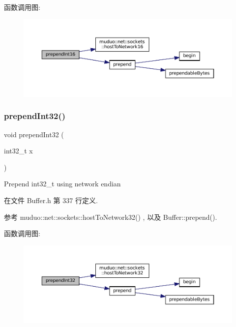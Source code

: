 函数调用图\+:
\nopagebreak
\begin{figure}[H]
\begin{center}
\leavevmode
\includegraphics[width=350pt]{classmuduo_1_1net_1_1Buffer_a1c47f5d97958f529ef78f0ba283e33d0_cgraph}
\end{center}
\end{figure}
\mbox{\label{classmuduo_1_1net_1_1Buffer_a280f25c26e5867377de5c0c31dbc06c1}} 
\subsubsection{\texorpdfstring{prepend\+Int32()}{prependInt32()}}
{\footnotesize\ttfamily void prepend\+Int32 (\begin{DoxyParamCaption}\item[{int32\+\_\+t}]{x }\end{DoxyParamCaption})\hspace{0.3cm}{\ttfamily [inline]}}

Prepend int32\+\_\+t using network endian 

在文件 Buffer.\+h 第 337 行定义.



参考 muduo\+::net\+::sockets\+::host\+To\+Network32() , 以及 Buffer\+::prepend().

函数调用图\+:
\nopagebreak
\begin{figure}[H]
\begin{center}
\leavevmode
\includegraphics[width=350pt]{classmuduo_1_1net_1_1Buffer_a280f25c26e5867377de5c0c31dbc06c1_cgraph}
\end{center}
\end{figure}
\mbox{\label{classmuduo_1_1net_1_1Buffer_a1c260d8fb7c6194ce8ca9859718239d3}} 
